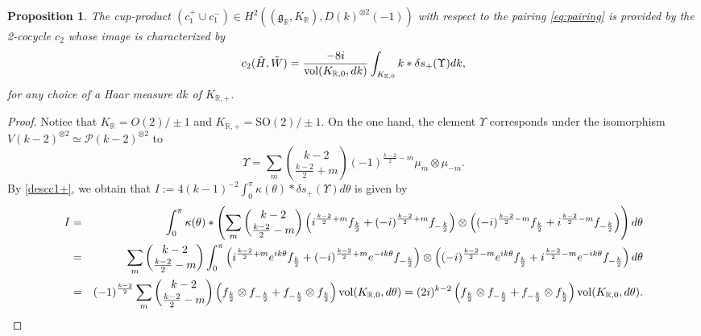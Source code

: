 \documentclass{amsart}
\newtheorem{proposition}[theorem]{Proposition}
\theoremstyle{definition}
\theoremstyle{remark}
\numberwithin{equation}{section}
\newcommand{\SO}{{\mathrm {SO}}}
\newcommand{\R}{{\mathbb R}}
\newcommand{\cP}{{\mathcal P}}
\newcommand{\mfg}{{\mathfrak g}}
\begin{document}
\begin{proposition}\label{propcupprod1}
    The cup-product $(c_1^+\cup c_1^-)\in H^2((\mfg_\R,K_\R),D(k)^{\otimes 2}(-1))$ with respect to the pairing \eqref{eq:pairing} is provided by the 2-cocycle $c_2$ whose image is characterized by
    \[
    c_2(\hat H,\tilde W)=\frac{-8i}{{\rm vol}(K_{\R,0},dk)}\int_{K_{\R,0}}k\ast \delta s_+(\Upsilon)d k,
    \]
    for any choice of a Haar measure $dk$ of $K_{\R,+}$.
\end{proposition}
\begin{proof}
Notice that $K_\R=O(2)/\pm 1$ and $K_{\R,+}=\SO(2)/\pm 1$. 
On the one hand, the element $\Upsilon$ corresponds  under the isomorphism $V(k-2)^{\otimes 2}\simeq \cP(k-2)^{\otimes 2}$ to
\[
\Upsilon=\sum_{m}\binom{k-2}{\frac{k-2}{2}+m}(-1)^{\frac{k-2}{2}-m} \mu_m\otimes\mu_{-m}.
\]
By \eqref{descc1+}, we obtain that $I:=4(k-1)^{-2}\int_{0}^\pi\kappa(\theta)\ast \delta s_+(\Upsilon)d \theta$ is given by
\begin{eqnarray*}
I&=&\int_{0}^\pi\kappa(\theta)\ast \left(\sum_{m}\binom{k-2}{\frac{k-2}{2}-m}\left(i^{\frac{k-2}{2}+m}f_{\frac{k}{2}}+ (-i)^{\frac{k-2}{2}+m}f_{-\frac{k}{2}}\right)\otimes \left((-i)^{\frac{k-2}{2}-m}f_{\frac{k}{2}}+ i^{\frac{k-2}{2}-m}f_{-\frac{k}{2}}\right)\right)d \theta\\
&=&\sum_{m}\binom{k-2}{\frac{k-2}{2}-m}\int_{0}^\pi\left(i^{\frac{k-2}{2}+m}e^{ik\theta}f_{\frac{k}{2}}+ (-i)^{\frac{k-2}{2}+m}e^{-ik\theta}f_{-\frac{k}{2}}\right)\otimes \left((-i)^{\frac{k-2}{2}-m}e^{ik\theta}f_{\frac{k}{2}}+ i^{\frac{k-2}{2}-m}e^{-ik\theta}f_{-\frac{k}{2}}\right)d \theta\\
&=&(-1)^{\frac{k-2}{2}}\sum_{m}\binom{k-2}{\frac{k-2}{2}-m}\left(f_{\frac{k}{2}}\otimes f_{-\frac{k}{2}}+ f_{-\frac{k}{2}}\otimes f_{\frac{k}{2}}\right){\rm vol}(K_{\R,0},d\theta)=(2i)^{k-2}\left(f_{\frac{k}{2}}\otimes f_{-\frac{k}{2}}+ f_{-\frac{k}{2}}\otimes f_{\frac{k}{2}}\right){\rm vol}(K_{\R,0},d\theta).
\end{eqnarray*}



\end{proof}
\end{document}
